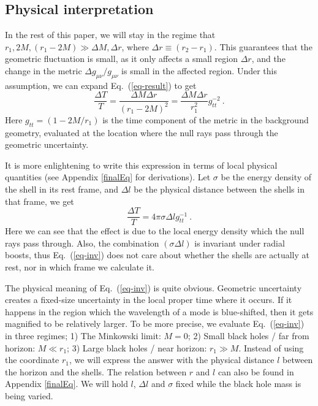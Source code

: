 \documentclass[aps,showpacs,onecolumn,floats,prd,superscriptaddress,nofootinbib]{revtex4-1}
\begin{document}
\subsection{Physical interpretation}

In the rest of this paper, we will stay in the regime that $r_1, 2M, (r_1-2M) \gg \Delta M, \Delta r$, where $\Delta r \equiv(r_2-r_1)$. 
This guarantees that the geometric fluctuation is small, as it only affects a small region $\Delta r$, and the change in the metric $\Delta g_{\mu\nu}/g_{\mu\nu}$ is small in the affected region.
Under this assumption, we can expand Eq.~(\ref{eq-result}) to get 
\begin{equation}
	\frac{\Delta T}{T} = \frac{\Delta M \Delta r}{(r_1-2M)^2} = \frac{\Delta M \Delta r}{r_1^2} g_{tt}^{-2}~.
		\label{lim-result}
\end{equation}
Here $g_{tt}=(1-2M/r_1)$ is the time component of the metric in the background geometry, evaluated at the location where the null rays pass through the geometric uncertainty. 

It is more enlightening to write this expression in terms of local physical quantities (see Appendix \ref{finalEq} for derivations).  Let $\sigma$ be the energy density of the shell in its rest frame, and $\Delta l$ be the physical distance between the shells in that frame, we get
\begin{equation}
	\frac{\Delta T}{T} = 4 \pi \sigma \Delta l g_{tt}^{-1}~.
	\label{eq-inv}
\end{equation}
Here we can see that the effect is due to the local energy density which the null rays pass through.
Also, the combination $(\sigma\Delta l)$ is invariant under radial boosts, thus Eq.~(\ref{eq-inv}) does not care about whether the shells are actually at rest, nor in which frame we calculate it.

The physical meaning of Eq.~(\ref{eq-inv}) is quite obvious. 
Geometric uncertainty creates a fixed-size uncertainty in the local proper time where it occurs.
If it happens in the region which the wavelength of a mode is blue-shifted, then it gets magnified to be relatively larger.
To be more precise, we evaluate Eq.~(\ref{eq-inv}) in three regimes; 
1) The Minkowski limit: $M=0$; 
2) Small black holes / far from horizon: $M \ll r_1$; 
3) Large black holes / near horizon: $r_1\gg M$. 
Instead of using the coordinate $r_1$, we will express the answer with the physical distance $l$ between the horizon and the shells. 
The relation between $r$ and $l$ can also be found in Appendix \ref{finalEq}. 
We will hold $l$, $\Delta l$ and $\sigma$ fixed while the black hole mass is being varied.
\end{document}
